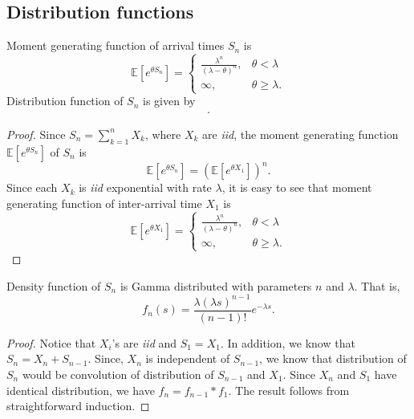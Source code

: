 \documentclass[a4paper,10pt,english]{article}
\begin{document}
\subsection{Distribution functions}
\begin{lem} Moment generating function of arrival times $S_n$ is 
 \begin{equation*}
  \mathbb{E} [ e^{\theta S_n} ] = 
		\begin{cases}
		\frac{\lambda^n}{(\lambda-\theta)^n}, & \theta < \lambda \\
		\infty, & \theta \geqslant \lambda.
		\end{cases} 
 \end{equation*} 
 Distribution function of $S_n$ is given by 
 \begin{align*}.
 \end{align*}
\end{lem}
\begin{proof} 
Since $S_n = \sum_{k=1}^nX_k$, where $X_k$ are \emph{iid}, the moment generating function $\mathbb{E} [ e^{\theta S_{n}} ]$ of $S_n$ is 
 \begin{equation*}
  \mathbb{E} [ e^{\theta S_{n}} ] = \left(\mathbb{E}[e^{\theta X_{1}}]\right)^{n}. 
 \end{equation*} 
Since each $X_k$ is \emph{iid} exponential with rate $\lambda$, it is easy to see that moment generating function of inter-arrival time $X_1$ is 
 \begin{equation*}
  \mathbb{E} [ e^{\theta X_1} ] = 
		\begin{cases}
		\frac{\lambda^n}{(\lambda-\theta)^n}, & \theta < \lambda \\
		\infty, & \theta \geqslant \lambda.
		\end{cases} 
 \end{equation*} 
\end{proof}

\begin{thm} Density function of $S_n$ is Gamma distributed with parameters $n$ and $\lambda$. That is,
\begin{equation*}
f_{n}(s) =\frac{\lambda (\lambda s)^{n-1}} {(n-1)!} e^{-\lambda s}.
\end{equation*}
\end{thm}
\begin{proof} Notice that $X_i$'s are \emph{iid} and $S_1 = X_1$. In addition, we know that $S_n = X_n + S_{n-1}$. Since, $X_n$ is independent of $S_{n-1}$, we know that distribution of $S_n$ would be convolution of distribution of $S_{n-1}$ and $X_1$. Since $X_n$ and $S_1$ have identical distribution, we have $f_{n}=f_{n-1}*f_{1}$. The result follows from straightforward induction.
\end{proof}
\end{document}
